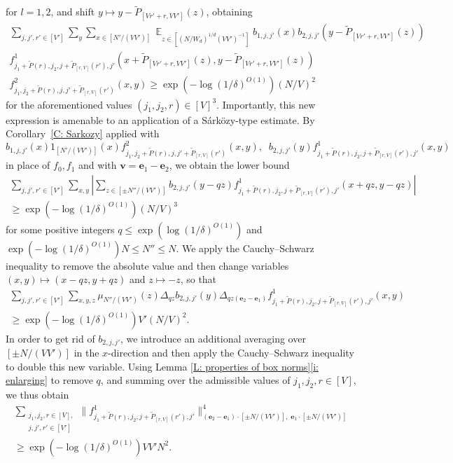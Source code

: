 \documentclass[11pt]{amsart}
\theoremstyle{definition}
\DeclareMathOperator*{\E}{\mathbb{E}}
\newcommand{\be}{{\mathbf{e}}}
\newcommand{\bv}{{\textbf{v}}}
\newcommand{\abs}[1]{\mathopen{}\left| #1\mathclose{}\right|}
\begin{document}
for $l=1,2$, and shift $y\mapsto y - \widetilde P_{[Vr'+r, VV']}(z)$, obtaining
\begin{multline*}
    \sum_{j,j',r'\in[V']}\sum_y\sum_{x\in [N'/(VV')]} \E_{z \in [(N/W_d)^{1/d}(VV')^{-1}]} b_{1,j,j'}(x)b_{2,j,j'}(y- \widetilde P_{[Vr'+r, VV']}(z))\\ 
     f^1_{j_1 + \widetilde P(r), j_2, j + \widetilde P_{[r, V]}(r'), j'}(x+ \widetilde P_{[Vr'+r, VV']}(z),y- \widetilde P_{[Vr'+r, VV']}(z))\\
     f^2_{j_1, j_2 + \widetilde P(r), j, j'+ \widetilde P_{[r, V]}(r')}(x,y)
     \geq \exp(-\log(1/\delta)^{O(1)})(N/V)^2
\end{multline*}
for the aforementioned values $(j_1, j_2, r) \in [V]^3$. Importantly, this new expression is amenable to an application of a S\'ark\"ozy-type estimate. By Corollary~\ref{C: Sarkozy} applied with $$b_{1,j,j'}(x)1_{[N'/(VV')]}(x) f^2_{j_1, j_2 + \widetilde P(r), j, j'+ \widetilde P_{[r, V]}(r')}(x,y),
\;\; b_{2,j,j'}(y) f^1_{j_1 + \widetilde P(r), j_2, j + \widetilde P_{[r, V]}(r'), j'}(x,y)$$ in place of $f_0, f_1$ and with $\bv = \be_1-\be_2$, we obtain the lower bound
\begin{multline*}
    \sum_{j,j',r'\in[V']}\sum_{x,y} \abs{\sum_{z\in[\pm N''/(VV')]} b_{2,j,j'}(y-qz) f^1_{j_1 + \widetilde P(r), j_2, j + \widetilde P_{[r, V]}(r'), j'}(x  + qz, y - qz)}\\ \geq \exp(-\log(1/\delta)^{O(1)}) (N/V)^3
\end{multline*}
for some positive integers $q\leq \exp(\log(1/\delta)^{O(1)})$ and $\exp(-\log(1/\delta)^{O(1)})N\leq N''\leq N$. We apply the Cauchy--Schwarz inequality to remove the absolute value and then change variables $(x,y)\mapsto (x-qz, y + qz)$ and $z\mapsto -z$, so that
\begin{multline*}
    \sum_{j,j',r'\in[V']}\sum_{x, y, z}\mu_{N''/(VV')}(z) \Delta_{qz} b_{2,j,j'}(y) \Delta_{qz(\be_2 - \be_1)} f^1_{j_1 + \widetilde P(r), j_2, j + \widetilde P_{[r, V]}(r'), j'}(x, y)\\ \geq \exp(-\log(1/\delta)^{O(1)})V'(N/V)^2.
\end{multline*}
In order to get rid of $b_{2,j,j'}$, we introduce an additional averaging over $[\pm N/(VV')]$ in the $x$-direction and then apply the Cauchy--Schwarz inequality to double this new variable. Using Lemma \ref{L: properties of box norms}\eqref{i: enlarging} to remove $q$, and summing over the admissible values of $j_1, j_2, r\in[V]$, we thus obtain
\begin{multline*}
    \sum_{\substack{j_1, j_2, r\in [V],\\ j,j',r'\in[V']}}\|f^1_{j_1 + \widetilde P(r), j_2, j + \widetilde P_{[r, V]}(r'), j'}\|_{(\be_2 - \be_1)\cdot[\pm N/(VV')],\; \be_1\cdot[\pm N/(VV')]}^4\\
    \geq \exp(-\log(1/\delta)^{O(1)}) VV' N^2.
\end{multline*}
\end{document}
